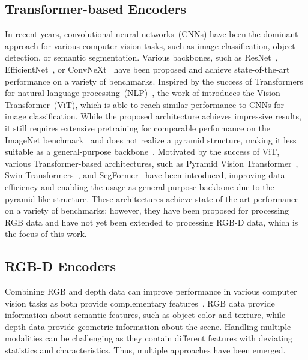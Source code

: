 \documentclass[conference]{IEEEtran}
\begin{document}
\subsection{Transformer-based Encoders}
In recent years, convolutional neural networks~(CNNs) have been the dominant approach for various computer vision tasks, such as image classification, object detection, or semantic segmentation.
Various backbones, such as ResNet~\cite{ResNet-cvpr2016}, EfficientNet~\cite{EfficientNet-icml2019}, or ConvNeXt~\cite{convnext-cvpr2022} have been proposed and achieve state-of-the-art performance on a variety of benchmarks.
Inspired by the success of Transformers for natural language processing~(NLP)~\cite{Transformer-neurips2017, bert-arxiv2018, gpt-neurips2017}, the work of \cite{vit-iclr2021} introduces the Vision Transformer~(ViT), which is able to reach similar performance to CNNs for image classification.
While the proposed architecture achieves impressive results, it still requires extensive pretraining for comparable performance on the ImageNet benchmark~\cite{ImageNet-ijcv2015} and does not realize a pyramid structure, making it less suitable as a general-purpose backbone~\cite{swin-iccv2021, SegFromer-neurips2021}.
Motivated by the success of ViT, various Transformer-based architectures, such as Pyramid Vision Transformer~\cite{pvt-iccv2021}, Swin Transformers~\cite{swin-iccv2021, swinv2-cvpr2022}, and SegFormer~\cite{SegFromer-neurips2021} have been introduced, improving data efficiency and enabling the usage as general-purpose backbone due to the pyramid-like structure.
These architectures achieve state-of-the-art performance on a variety of benchmarks; however, they have been proposed for processing RGB data and have not yet been extended to processing RGB-D data, which is the focus of this work.

\subsection{RGB-D Encoders}
Combining RGB and depth data can improve performance in various computer vision tasks as both provide complementary features~\cite{FuseNet-accv2016, RedNet-arxiv2018, ACNet-icip2019}. 
RGB data provide information about semantic features, such as object color and texture, while depth data provide geometric information about the scene.
Handling multiple modalities can be challenging as they contain different features with deviating statistics and characteristics.
Thus, multiple approaches have been emerged.
\end{document}
